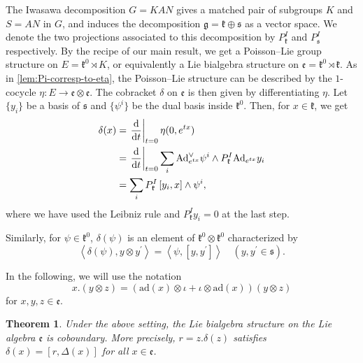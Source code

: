 \documentclass[a4paper,11pt]{amsart}
\newcommand{\fr}[1]{\mathfrak{#1}}
\newcommand{\ox}{\otimes}
\newcommand{\pr}{\prime}
\newcommand{\Ad}{\mathrm{Ad}}
\newcommand{\ad}{\mathrm{ad}}
\newtheorem{thm}{Theorem}[section]
\theoremstyle{definition}
\theoremstyle{remark}
\begin{document}
The Iwasawa decomposition $G = K A N$ gives a matched pair of subgroups $K$ and $S = A N$ in $G$, and induces the decomposition $\fr{g} = \fr{k} \oplus \fr{s}$ as a vector space.
We denote the two projections associated to this decomposition by $P^I_{\fr{k}}$ and $P^I_{\fr{s}}$ respectively.
By the recipe of our main result, we get a Poisson--Lie group structure on $E = \fr{k}^0 \rtimes K$, or equivalently a Lie bialgebra structure on $\fr{e} = \fr{k}^0 \rtimes \fr{k}$.
As in \ref{lem:Pi-corresp-to-eta}, the Poisson--Lie structure can be described by the $1$-cocycle $\eta\colon E \rightarrow \fr{e} \ox \fr{e}$.
The cobracket $\delta$ on $\fr{e}$ is then given by differentiating $\eta$.
Let $\{y_i\}$ be a basis of $\fr{s}$ and $\{\psi^i\}$ be the dual basis inside $\fr{k}^0$.
Then, for $x\in \fr{k}$, we get
\begin{align*}
    \delta(x) &= \left.\dv{t}\right|_{t=0} \eta(0,e^{tx}) \\
    &= \left.\dv{t}\right|_{t=0} \sum_i \Ad^\vee_{e^{tx}} \psi^i \wedge P^I_{\fr{k}}\Ad_{e^{tx}} y_i \\
    &= \sum_i P^I_{\fr{k}} \left[ y_i , x \right] \wedge \psi^i ,
\end{align*}
where we have used the Leibniz rule and $P^I_{\fr{k}} y_i = 0$ at the last step.

Similarly, for $\psi \in \fr{k}^0$, $\delta(\psi)$ is an element of $\fr{k}^0 \ox \fr{k}^0$  characterized by 
\begin{equation*}
 \left\langle \delta(\psi) , y \ox y^\pr \right\rangle = \left\langle \psi , \left[ y , y^\pr \right] \right\rangle \quad(y, y^\pr \in \fr{s}).
\end{equation*}

In the following, we will use the notation
\begin{equation*}
    x.(y\ox z) = \left( \ad(x) \ox \iota + \iota \ox \ad(x) \right) (y\ox z) 
\end{equation*}
for $x, y, z \in \fr{e}$.

\begin{thm}
\label{thm:gen-e2-from-herm-simpl-cobdry}
Under the above setting, the Lie bialgebra structure on the Lie algebra $\fr{e}$ is coboundary.
More precisely, $r = z.\delta(z)$ satisfies $\delta(x) = [r, \Delta(x)]$ for all $x \in \fr{e}$.
\end{thm}
\end{document}
